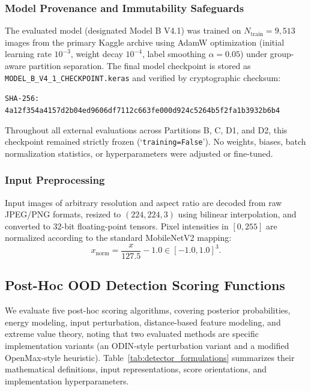 \subsubsection{Model Provenance and Immutability Safeguards}
The evaluated model (designated Model B V4.1) was trained on $N_{\text{train}} = 9,513$ images from the primary Kaggle archive using AdamW optimization (initial learning rate $10^{-3}$, weight decay $10^{-4}$, label smoothing $\alpha = 0.05$) under group-aware partition separation. The final model checkpoint is stored as {\small\nolinkurl{MODEL_B_V4_1_CHECKPOINT.keras}} and verified by cryptographic checksum:
\begin{center}
\footnotesize
\texttt{SHA-256: 4a12f354a4157d2b04ed9606df7112c663fe000d924c5264b5f2fa1b3932b6b4}
\end{center}
Throughout all external evaluations across Partitions B, C, D1, and D2, this checkpoint remained strictly frozen (`\texttt{training=False}'). No weights, biases, batch normalization statistics, or hyperparameters were adjusted or fine-tuned.

\subsubsection{Input Preprocessing}
Input images of arbitrary resolution and aspect ratio are decoded from raw JPEG/PNG formats, resized to $(224, 224, 3)$ using bilinear interpolation, and converted to 32-bit floating-point tensors. Pixel intensities in $[0, 255]$ are normalized according to the standard MobileNetV2 mapping:
\begin{equation}
x_{\text{norm}} = \frac{x}{127.5} - 1.0 \in [-1.0, 1.0]^3.
\end{equation}

\subsection{Post-Hoc OOD Detection Scoring Functions}
\label{sec:ood_scoring_functions}

We evaluate five post-hoc scoring algorithms, covering posterior probabilities, energy modeling, input perturbation, distance-based feature modeling, and extreme value theory, noting that two evaluated methods are specific implementation variants (an ODIN-style perturbation variant and a modified OpenMax-style heuristic). Table~\ref{tab:detector_formulations} summarizes their mathematical definitions, input representations, score orientations, and implementation hyperparameters.

